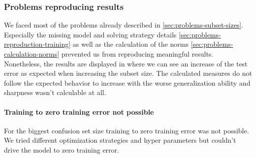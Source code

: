 \subsubsection{Problems reproducing results}
We faced most of the problems already described in \ref{sec:problems-subset-sizes}. Especially the missing model and solving strategy details \ref{sec:problems-reproduction-training} as well as the calculation of the norms \ref{sec:problems-calculation-norms} prevented us from reproducing meaningful results. Nonetheless, the results are displayed in  where we can see an increase of the test error as expected when increasing the subset size. The calculated measures do not follow the expected behavior to increase with the worse generalization ability and sharpness wasn't calculable at all.
%
\paragraph{Training to zero training error not possible}
For the biggest confusion set size training to zero training error was not possible. We tried different optimization strategies and hyper parameters but couldn't drive the model to zero training error.
%
%
%
%
%
%
%
